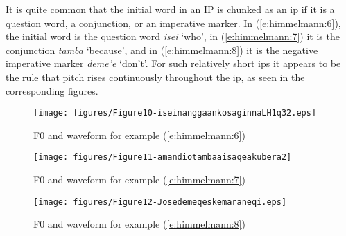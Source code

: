 \documentclass[output=paper
,modfonts
,nonflat]{langsci/langscibook}
\begin{document}
\largerpage
It is quite common that the initial word in an IP is chunked as an ip if it is a question word, a conjunction, or an imperative marker. In (\ref{e:himmelmann:6}), the initial word is the question word \textit{isei} ‘who’, in (\ref{e:himmelmann:7}) it is the conjunction \textit{tamba} ‘because’, and in (\ref{e:himmelmann:8}) it is the negative imperative marker \textit{deme'e} ‘don’t’. For such relatively short ips it appears to be the rule that pitch rises continuously throughout the ip, as seen in the corresponding figures.


\begin{figure}
	\texttt{[image: figures/Figure10-iseinanggaankosaginnaLH1q32.eps]}
	\caption{F0 and waveform for example (\ref{e:himmelmann:6})}
	\label{f10}
\end{figure}


\begin{figure}
	\texttt{[image: figures/Figure11-amandiotambaaisaqeakubera2]}
	\caption{F0 and waveform for example (\ref{e:himmelmann:7})}
	\label{f11}
\end{figure}


\begin{figure}
	\texttt{[image: figures/Figure12-Josedemeqeskemaraneqi.eps]}
	\caption{F0 and waveform for example (\ref{e:himmelmann:8})}
	\label{f12}
\end{figure}
\end{document}
